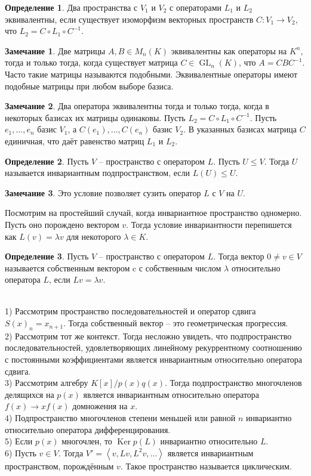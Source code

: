\documentclass[10pt,a4paper,oneside]{book}
\theoremstyle{definition}
\newtheorem*{rem}{Замечание}
\newtheorem*{defn}{Определение}
\DeclareMathOperator{\Ker}{Ker}
\newcommand{\GL}{\operatorname{GL}}
\def\exm{\noindent {\bf Примеры:}}
\def\lan{\left\langle }
\def\ran{\right\rangle}
\def\dfn{\begin{defn}}
\def\edfn{\end{defn}}
\def\rm{\begin{rem}}
\def\erm{\end{rem}}
\begin{document}
\dfn Два пространства с $V_1$ и $V_2$ с операторами $L_1$ и $L_2$ эквивалентны, если существует изоморфизм векторных пространств $C \colon V_1 \to V_2$, что $L_2=C \circ L_1 \circ C^{-1}$.
\edfn


\rm Две матрицы $A, B \in M_n(K)$ эквивалентны как операторы на $K^n$, тогда и только тогда, когда существует матрица $C \in \GL_n(K)$, что $A=CBC^{-1}$. Часто такие матрицы называются подобными. Эквивалентные операторы имеют подобные матрицы при любом выборе базиса.
\erm

\rm Два оператора эквивалентны тогда и только тогда, когда в некоторых базисах их матрицы одинаковы.
\proof Пусть $L_2=C \circ L_1 \circ C^{-1}$. Пусть $e_1,\dots,e_n$ базис $V_1$, а $C(e_1),\dots,C(e_n)$ базис $V_2$. В указанных базисах матрица $C$ единичная, что даёт равенство матриц $L_1$ и $L_2$.
\endproof
\erm


\dfn Пусть $V$ -- пространство с оператором $L$. Пусть $U\leq V$. Тогда $U$ называется инвариантным подпространством, если $L(U) \leq U$.
\edfn

\rm Это условие позволяет сузить оператор $L$ с $V$ на $U$.
\erm

Посмотрим на простейший случай, когда инвариантное пространство одномерно. Пусть оно порождено вектором $v$. Тогда условие инвариантности перепишется как $L(v) = \lambda v$ для некоторого $\lambda \in K$.


\dfn Пусть $V$ -- пространство с оператором $L$. Тогда вектор $0\neq v\in V$ называется собственным вектором c с собственным числом $\lambda$ относительно оператора $L$, если $Lv=\lambda v$.
\edfn

\exm \\
1) Рассмотрим пространство  последовательностей и оператор сдвига $S(x)_n= x_{n+1}$. Тогда собственный вектор -- это геометрическая прогрессия.\\
2) Рассмотрим тот же контекст. Тогда несложно увидеть, что подпространство последовательностей, удовлетворяющих линейному рекуррентному соотношению с постоянными коэффициентами является инвариантным относительно оператора сдвига.\\
3) Рассмотрим алгебру $K[x]/p(x)q(x)$. Тогда подпространство многочленов делящихся на $p(x)$ является инвариантным относительно оператора $f(x) \to x f(x)$ домножения на $x$.\\
4) Подпространство многочленов степени меньшей или равной $n$ инвариантно относительно оператора дифференцирования.\\
5) Если $p(x)$ многочлен, то $\Ker p(L)$ инвариантно относительно $L$.\\
6) Пусть $v \in V$. Тогда  $V'=\lan v, Lv, L^2v,\dots \ran$ является инвариантным пространством, порождённым $v$. Такое пространство называется циклическим.\\
\end{document}
